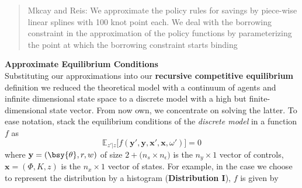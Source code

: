\documentclass[a4paper,10pt]{article}  %
\begin{document}
\begin{quote}
   Mkcay and Reis: We approximate the policy rules for savings by piece-wise linear splines with
   100 knot point each. We deal with the borrowing constraint in the approximation of the policy
   functions by parameterizing the point at which the borrowing constraint starts binding
\end{quote}

\textbf{Approximate Equilibrium Conditions} \\ Substituting our approximations into our \textbf{recursive competitive equilibrium}
definition we reduced the theoretical model with a continuum of agents and infinite dimensional state space to a discrete model with 
a high but finite-dimensional state vector. From now own, we concentrate on solving the latter. To ease notation, stack the equilibrium
conditions of the \emph{discrete model} in a function $ f $ as
\begin{equation}
   \label{eq:SYSTEM}
   \mathbb{E}_{z'|z} \Big[ f(\mathbf{y}',\mathbf{y},\mathbf{x}',\mathbf{x}, \omega') \Big] = 0
\end{equation}
where $ \mathbf{y} = ( \bsy{\theta}, r, w )  $ of size $2 +\big(n_s\times n_{\epsilon}\big)$ is the $ n_y\times 1 $ vector of controls,
$ \mathbf{x} = (\Phi, K, z )$ is the $ n_x\times 1 $ vector of states. For example, in the case we choose to represent the distribution
by a histogram (\textbf{Distribution I}), $f$ is given by
\end{document}
